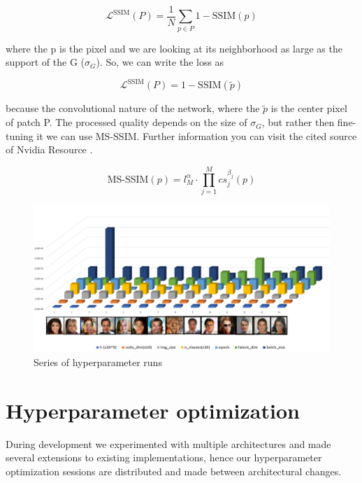 \documentclass[10pt,journal,compsoc]{IEEEtran}
\begin{document}
\begin{equation}
	\mathcal{L}^{\mathrm{SSIM}}(P) = \frac{1}{N}\sum_{p \in P}1-\mathrm{SSIM}(p)
\end{equation}

where the p is the pixel and we are looking at its neighborhood as large as the support of the G ($\sigma_G$). So, we can write the loss as

\begin{equation}
\mathcal{L}^{\mathrm{SSIM}}(P) = 1-\mathrm{SSIM}(\tilde{p})
\end{equation}

because the convolutional nature of the network, where the $\tilde{p}$ is the center pixel of patch P. 
The processed quality depends on the size of $\sigma_G$, but rather then fine-tuning it we can use MS-SSIM. Further information you can visit the cited source of Nvidia Resource \cite{zhao2015loss}.

\begin{equation}
		\mathrm{MS\mbox{-}SSIM}(p) = l_M^\alpha \cdot \prod_{j=1}^{M}cs_j^{\beta_j}(p)
\end{equation}

\begin{figure}[b]
	\centering
	\includegraphics[width=\textwidth]{pic/hyperparamopt}
	\caption{Series of hyperparameter runs}
	\label{fig:hyperparamteres}
\end{figure}

\section{Hyperparameter optimization}

During development we experimented with multiple architectures and made several extensions to existing implementations, hence our hyperparameter optimization sessions are distributed and made between architectural changes.
\end{document}
